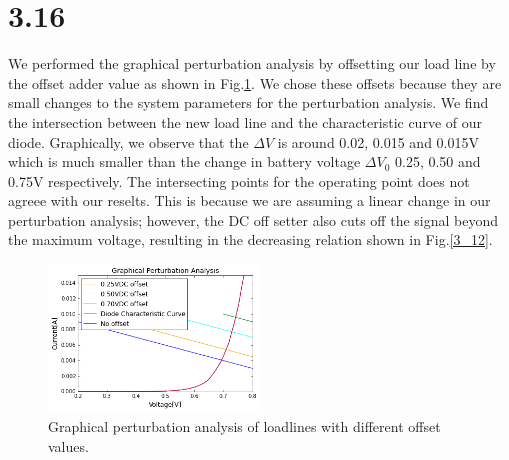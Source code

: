 \documentclass[authoryear, 12pt,5p, times]{elsarticle}
\begin{document}
\section*{3.16}
We performed the graphical perturbation analysis by offsetting our load line by the offset adder value as shown in Fig.\ref{perturb}. We chose these offsets because they are small changes to the system parameters for the perturbation analysis.  We find the intersection between the new load line and the characteristic curve of our diode. Graphically, we observe that the $\Delta V$ is around 0.02, 0.015 and 0.015V which is much smaller than the change in battery voltage $\Delta V_0$ 0.25, 0.50 and 0.75V respectively. The intersecting points for the operating point does not agreee with our reselts. This is because we are assuming a linear change in our perturbation analysis; however, the DC off setter also cuts off the signal beyond the maximum voltage, resulting in the decreasing relation shown in Fig.\ref{3_12}.
\begin{figure}[h!]
\center
\includegraphics[width=0.5\textwidth]{figure/doris}
\caption{Graphical perturbation analysis of loadlines with different offset values.}
\label{perturb}
\end{figure}
\end{document}
